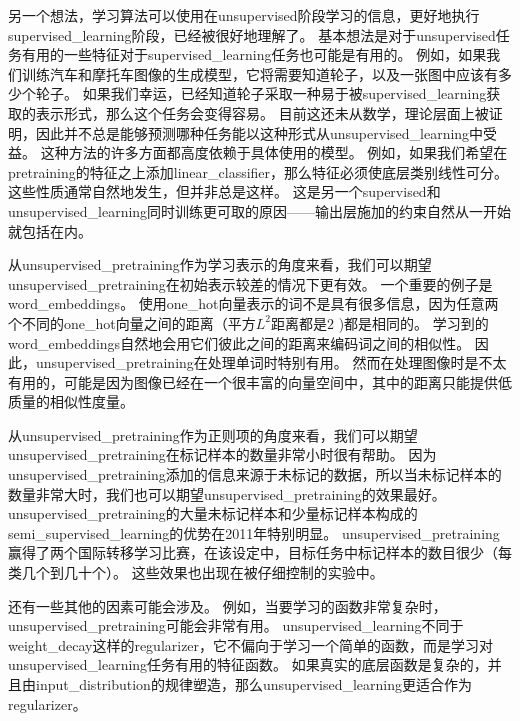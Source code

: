 另一个想法，学习算法可以使用在\gls{unsupervised}阶段学习的信息，更好地执行\gls{supervised_learning}阶段，已经被很好地理解了。
基本想法是对于\gls{unsupervised}任务有用的一些特征对于\gls{supervised_learning}任务也可能是有用的。
例如，如果我们训练汽车和摩托车图像的生成模型，它将需要知道轮子，以及一张图中应该有多少个轮子。
如果我们幸运，已经知道轮子采取一种易于被\gls{supervised_learning}获取的表示形式，那么这个任务会变得容易。
目前这还未从数学，理论层面上被证明，因此并不总是能够预测哪种任务能以这种形式从\gls{unsupervised_learning}中受益。
这种方法的许多方面都高度依赖于具体使用的模型。
例如，如果我们希望在\gls{pretraining}的特征之上添加\gls{linear_classifier}，那么特征必须使底层类别线性可分。
这些性质通常自然地发生，但并非总是这样。
这是另一个\gls{supervised}和\gls{unsupervised_learning}同时训练更可取的原因——输出层施加的约束自然从一开始就包括在内。


从\gls{unsupervised_pretraining}作为学习表示的角度来看，我们可以期望\gls{unsupervised_pretraining}在初始表示较差的情况下更有效。
一个重要的例子是\gls{word_embeddings}。
使用\gls{one_hot}向量表示的词不是具有很多信息，因为任意两个不同的\gls{one_hot}向量之间的距离（平方$L^2$距离都是$2$ )都是相同的。
学习到的\gls{word_embeddings}自然地会用它们彼此之间的距离来编码词之间的相似性。
因此，\gls{unsupervised_pretraining}在处理单词时特别有用。
然而在处理图像时是不太有用的，可能是因为图像已经在一个很丰富的向量空间中，其中的距离只能提供低质量的相似性度量。


从\gls{unsupervised_pretraining}作为正则项的角度来看，我们可以期望\gls{unsupervised_pretraining}在标记样本的数量非常小时很有帮助。
因为\gls{unsupervised_pretraining}添加的信息来源于未标记的数据，所以当未标记样本的数量非常大时，我们也可以期望\gls{unsupervised_pretraining}的效果最好。
\gls{unsupervised_pretraining}的大量未标记样本和少量标记样本构成的\gls{semi_supervised_learning}的优势在2011年特别明显。
\gls{unsupervised_pretraining}赢得了两个国际转移学习比赛\citep{UTLC+LISA-2011-small,goodfellow+all-NIPS2011}，在该设定中，目标任务中标记样本的数目很少（每类几个到几十个）。
这些效果也出现在被\citep{paine2014analysis}仔细控制的实验中。


还有一些其他的因素可能会涉及。
例如，当要学习的函数非常复杂时，\gls{unsupervised_pretraining}可能会非常有用。
\gls{unsupervised_learning}不同于\gls{weight_decay}这样的\gls{regularizer}，它不偏向于学习一个简单的函数，而是学习对\gls{unsupervised_learning}任务有用的特征函数。
如果真实的底层函数是复杂的，并且由\gls{input_distribution}的规律塑造，那么\gls{unsupervised_learning}更适合作为\gls{regularizer}。



